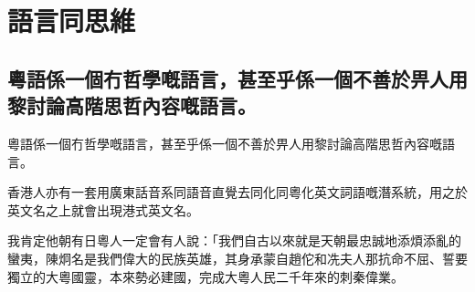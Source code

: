\chapter{語言同思維}

\section{粵語係一個冇哲學嘅語言，甚至乎係一個不善於畀人用黎討論高階思哲內容嘅語言。}
粵語係一個冇哲學嘅語言，甚至乎係一個不善於畀人用黎討論高階思哲內容嘅語言。


香港人亦有一套用廣東話音系同語音直覺去同化同粵化英文詞語嘅潛系統，用之於英文名之上就會出現港式英文名。



我肯定他朝有日粵人一定會有人說：「我們自古以來就是天朝最忠誠地添煩添亂的蠻夷，陳炯名是我們偉大的民族英雄，其身承蒙自趙佗和冼夫人那抗命不屈、誓要獨立的大粵國靈，本來勢必建國，完成大粵人民二千年來的刺秦偉業。